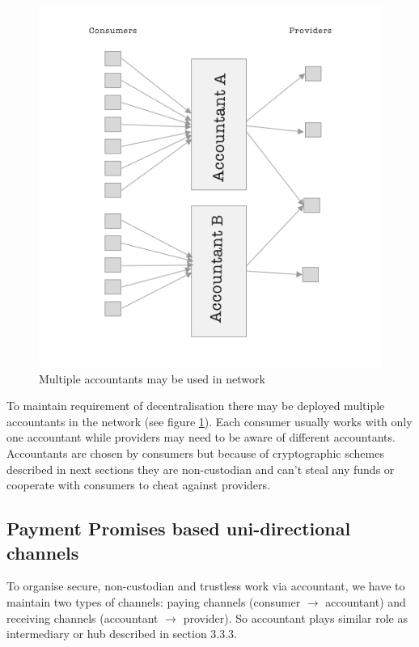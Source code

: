 \documentclass[a4paper,12pt]{article}
\begin{document}
\begin{figure}[H]
    \centering
    \includegraphics[scale=0.5]{img/multi-accountants}
    \caption{Multiple accountants may be used in network}
    \label{img:multi-accountants}
\end{figure}

To maintain requirement of decentralisation there may be deployed multiple 
accountants in the network (see figure \ref{img:multi-accountants}). Each 
consumer usually works with only one accountant while providers may need to be 
aware of different accountants. Accountants are chosen by consumers but because 
of cryptographic schemes described in next sections they are non-custodian and 
can't steal any funds or cooperate with consumers to cheat against providers.

\subsection{Payment Promises based uni-directional channels}

To organise secure, non-custodian and trustless work via accountant, we have to 
maintain two types of channels: paying channels (consumer $\rightarrow$ 
accountant) and receiving channels (accountant $\rightarrow$ provider). So 
accountant plays similar role as intermediary or hub described in section 3.3.3.
\end{document}
